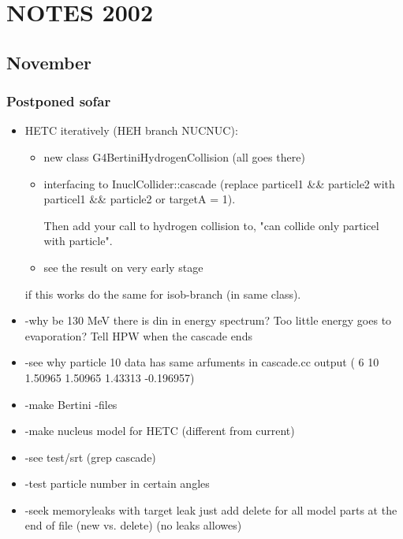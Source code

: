 \section{NOTES 2002}
\subsection{November}
\label{notes}

\subsubsection{Postponed sofar}
\begin{itemize}
  
\item HETC iteratively (HEH branch NUCNUC):

  \begin{itemize}
  \item new class G4BertiniHydrogenCollision (all goes there)
  \item interfacing to InuclCollider::cascade (replace particel1 \&\&
    particle2 with particel1 \&\& particle2 or {\sf targetA = 1}).
    
    Then add your call to hydrogen collision to, "can collide only
    particel with particle".

  \item see the result on very early stage
  \end{itemize}
  
  if this works do the same for isob-branch (in same class).
  
\item -why be 130 MeV there is din in energy spectrum?  Too little
  energy goes to evaporation?  Tell HPW when the cascade ends
  
\item -see why particle 10 data has same arfuments in cascade.cc
  output ( 6 10 1.50965 1.50965 1.43313 -0.196957)
  
\item -make Bertini -files
  
\item -make nucleus model for HETC (different from current)
  
\item -see test/srt (grep cascade)
  
\item -test particle number in certain angles
  
\item -seek memoryleaks with target leak just add delete for all model
  parts at the end of file (new vs. delete) (no leaks allowes)


\end{itemize}
